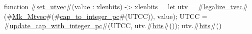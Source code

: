 function #\hyperref[sailRISCVzsetzyutvec]{set\_utvec}#(value : xlenbits) -> xlenbits = {
  let utv = #\hyperref[sailRISCVzlegalizzezytvec]{legalize\_tvec}#(#\hyperref[sailRISCVzMkzyMtvec]{Mk\_Mtvec}#(#\hyperref[sailRISCVzcapzytozyintegerzypc]{cap\_to\_integer\_pc}#(UTCC)), value);
  UTCC = #\hyperref[sailRISCVzupdatezycapzywithzyintegerzypc]{update\_cap\_with\_integer\_pc}#(UTCC, utv.#\hyperref[sailRISCVzbits]{bits}#());
  utv.#\hyperref[sailRISCVzbits]{bits}#()
}
